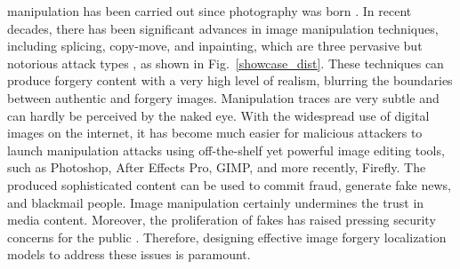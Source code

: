 \documentclass[10pt,journal,compsoc]{IEEEtran}
\begin{document}




 manipulation has been carried out since photography was born \cite{image_mani}. In recent decades, there has been significant advances in image manipulation techniques, including splicing, copy-move, and inpainting, which are three pervasive but notorious attack types \cite{verdoliva2020media}, as shown in Fig.~\ref{showcase_dist}. These techniques can produce forgery content with a very high level of realism, blurring the boundaries between authentic and forgery images. Manipulation traces are very subtle and can hardly be perceived by the naked eye. With the widespread use of digital images on the internet, it has become much easier for malicious attackers to launch manipulation attacks using off-the-shelf yet powerful image editing tools, such as Photoshop, After Effects Pro, GIMP, and more recently, Firefly. The produced sophisticated content can be used to commit fraud, generate fake news, and blackmail people. Image manipulation certainly undermines the trust in media content. Moreover, the proliferation of fakes has raised pressing security concerns for the public \cite{kong2023digital}. Therefore, designing effective image forgery localization models to address these issues is paramount.
\end{document}
